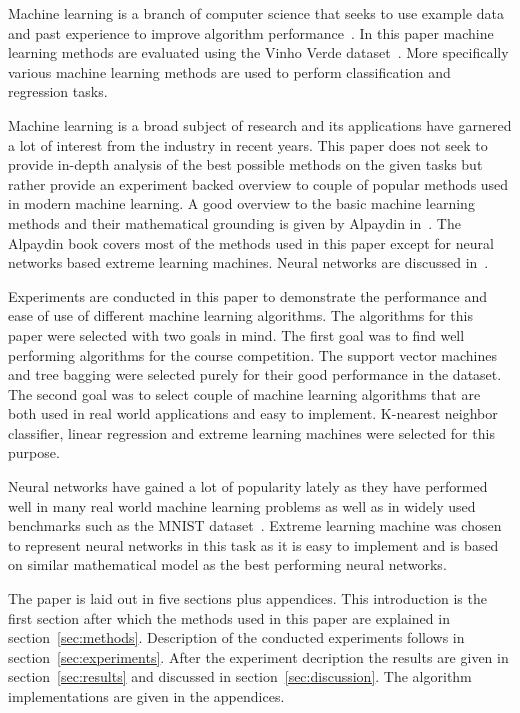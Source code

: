Machine learning is a branch of computer science that seeks to use example data and past experience to improve algorithm performance~\cite{alpaydin:2004:introduction}. In this paper machine learning methods are evaluated using the Vinho Verde dataset~\cite{cortez:2009:modeling}. More specifically various machine learning methods are used to perform classification and regression tasks. 

Machine learning is a broad subject of research and its applications have garnered a lot of interest from the industry in recent years. This paper does not seek to provide in-depth analysis of the best possible methods on the given tasks but rather provide an experiment backed overview to couple of popular methods used in modern machine learning. A good overview to the basic machine learning methods and their mathematical grounding is given by Alpaydin in~\cite{alpaydin:2004:introduction}. The Alpaydin book covers most of the methods used in this paper except for neural networks based extreme learning machines. Neural networks are discussed in~\cite{haykin:2009:neural-networks}.

Experiments are conducted in this paper to demonstrate the performance and ease of use of different machine learning algorithms. The algorithms for this paper were selected with two goals in mind. The first goal was to find well performing algorithms for the course competition. The support vector machines and tree bagging were selected purely for their good performance in the dataset. The second goal was to select couple of machine learning algorithms that are both used in real world applications and easy to implement. K-nearest neighbor classifier, linear regression and extreme learning machines were selected for this purpose.

Neural networks have gained a lot of popularity lately as they have performed well in many real world machine learning problems as well as in widely used benchmarks such as the MNIST dataset~\cite{wan:2013:regularization, ciresan:2012:multi, haykin:2009:neural-networks}. Extreme learning machine was chosen to represent neural networks in this task as it is easy to implement and is based on similar mathematical model as the best performing neural networks.

The paper is laid out in five sections plus appendices. This introduction is the first section after which the methods used in this paper are explained in section~\ref{sec:methods}. Description of the conducted experiments follows in section~\ref{sec:experiments}. After the experiment decription the results are given in section~\ref{sec:results} and discussed in section~\ref{sec:discussion}. The algorithm implementations are given in the appendices.
